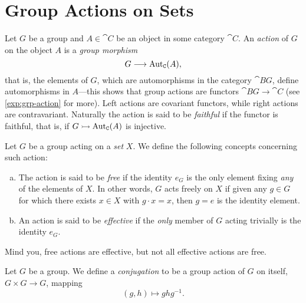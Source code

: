 \section{Group Actions on Sets}

\begin{definition}
\label{def:group-action}
Let \(G\) be a group and \(A \in \cat C\) be an object in some category
\(\cat C\). An \emph{action} of \(G\) on the object \(A\) is a \emph{group
  morphism}
\[
G \longrightarrow \operatorname{Aut}_{\texttt C}(A),
\]
that is, the elements of \(G\), which are automorphisms in the category
\(\cat{B}G\), define automorphisms in \(A\)---this shows that group actions
are functors \(\cat{B}G \to \cat C\) (see \cref{exp:grp-action} for more). Left
actions are covariant functors, while right actions are contravariant.
Naturally the action is said to be \emph{faithful} if the functor is faithful,
that is, if \(G \rightarrowtail \operatorname{Aut}_{\texttt C}(A)\) is injective.
\end{definition}

\begin{definition}
\label{def:free-effective-action}
Let \(G\) be a group acting on a \emph{set} \(X\). We define the following
concepts concerning such action:
\begin{enumerate}[(a)]\setlength\itemsep{0em}
\item The action is said to be \emph{free} if the identity \(e_G\) is the only
  element fixing \emph{any} of the elements of \(X\). In other words, \(G\) acts
  freely on \(X\) if given any \(g \in G\) for which there exists \(x \in X\)
  with \(g \cdot x = x\), then \(g = e\) is the identity element.

\item An action is said to be \emph{effective} if the \emph{only} member of
  \(G\) acting trivially is the identity \(e_G\).
\end{enumerate}
\end{definition}

\begin{remark}
\label{rem:free-versus-effective-actions}
Mind you, free actions are effective, but not all effective actions are free.
\end{remark}

\begin{definition}[Conjugation]
\label{def:group-conjugation-action}
Let \(G\) be a group. We define a \emph{conjugation} to be a group action of
\(G\) on itself, \(G \times G \to G\), mapping
\[
(g, h) \longmapsto g h g^{-1}.
\]
\end{definition}

